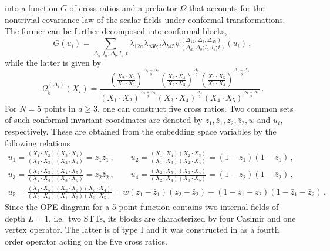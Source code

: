 \documentclass{article}
\begin{document}
into a function $G$ of cross ratios and a prefactor $\Omega$  that accounts for the 
nontrivial covariance law of the scalar fields under conformal transformations. 
The former can be further decomposed into conformal blocks, 
\begin{equation} 
 G(u_i) = \sum_{\Delta_a,l_a,\Delta_b,l_b,t}\! \lambda_{12a}\lambda_{a 3 b;t}\lambda_{b45} \psi^{(\Delta_{12},\Delta_3,\Delta_{45})}_{(\Delta_a,\Delta_b;l_a,l_b;t)}
    (u_i)\,,
\end{equation}
while the latter is given by 
\begin{equation}
		\Omega^{(\Delta_i)}_5(X_i)=\frac{\left(\frac{X_2\cdot X_3}{X_1\cdot X_3}\right)^{\frac{\Delta_1-\Delta_2}{2}} \left(\frac{X_2\cdot X_4}{X_2\cdot X_3}\right)^{\frac{\Delta_3}{2}} 		\left(\frac{X_3\cdot X_5}{X_3\cdot X_4}\right)^{\frac{\Delta_4-\Delta_5}{2}}}{\left(X_1\cdot X_2\right)^{\frac{\Delta_1+\Delta_2}{2}}\left( X_3\cdot X_4\right)^{\frac{\Delta_3}{2}}
		\left(X_4\cdot X_5\right)^{\frac{\Delta_4+\Delta_5}{2}}} \,. 
		\label{Omegafivepts}
	\end{equation}
For $N=5$ points in $d\geq 3$, one can construct five cross ratios. Two common sets of 
such conformal invariant coordinates are denoted by $z_1,\bar{z}_1,z_2,\bar{z}_2,w$ and 
$u_i$, respectively. These are obtained from the embedding space variables by the 
following relations
\begin{equation}
        \begin{gathered}
        u_1=\frac{\left(X_1\cdot X_2\right) \left(X_3\cdot X_4\right)}{\left(X_1\cdot X_3\right) \left(X_2 \cdot X_4\right)}=z_1 \bar{z_1}\,,\qquad u_2=\frac{\left(X_1\cdot X_4\right) \left(X_2\cdot X_3\right)}{\left(X_1\cdot X_3\right) \left(X_2 \cdot X_4\right)}=(1-z_1)(1-\bar{z}_1)\,,\\
    u_3=\frac{\left(X_2\cdot X_3\right) \left(X_4\cdot X_5\right)}{\left(X_2\cdot X_4\right) \left(X_3 \cdot X_5\right)}=z_2 \bar{z}_2\,, \qquad u_4=\frac{\left(X_2\cdot X_5\right) \left(X_3\cdot X_4\right)}{\left(X_2\cdot X_4\right) \left(X_3 \cdot X_5\right)}=(1-z_2)(1-\bar{z}_2)\,,\\
    u_5=\frac{\left(X_1\cdot X_5\right) \left(X_2\cdot X_3\right)\left(X_3\cdot X_4\right)}{\left(X_2\cdot X_4\right) \left(X_1 \cdot X_3\right)\left(X_3\cdot X_5\right)}=w(z_1-\bar{z}_1)(z_2-\bar{z}_2)+(1-z_1-z_2)(1-\bar{z}_1-\bar{z}_2)\,.
        \end{gathered}
\end{equation} 
Since the OPE diagram for a  5-point function contains two internal fields of depth $L=1$, 
i.e.\ two STTs, its blocks are characterized by four Casimir and one 
vertex operator. The latter is of type I and it was constructed in \cite{Buric:2021ywo} as 
a fourth order operator acting on the five cross ratios.
\medskip 
\end{document}

